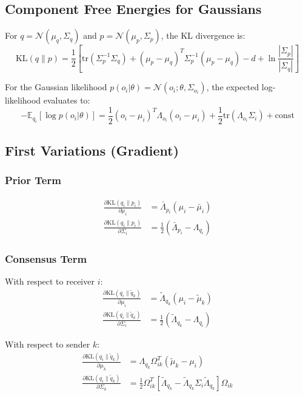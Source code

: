 \documentclass[11pt]{article}
\begin{document}
\subsection{Component Free Energies for Gaussians}

For $q = \mathcal{N}(\mu_q, \Sigma_q)$ and $p = \mathcal{N}(\mu_p, \Sigma_p)$, the KL divergence is:
\begin{equation}
\mathrm{KL}(q \| p) = \frac{1}{2}\left[\mathrm{tr}(\Sigma_p^{-1}\Sigma_q) + (\mu_p - \mu_q)^T \Sigma_p^{-1}(\mu_p - \mu_q) - d + \ln\frac{|\Sigma_p|}{|\Sigma_q|}\right]
\end{equation}

For the Gaussian likelihood $p(o_i | \theta) = \mathcal{N}(o_i; \theta, \Sigma_{o_i})$, the expected log-likelihood evaluates to:
\begin{equation}
-\mathbb{E}_{q_i}[\log p(o_i | \theta)] = \frac{1}{2}(o_i - \mu_i)^T \Lambda_{o_i}(o_i - \mu_i) + \frac{1}{2}\mathrm{tr}(\Lambda_{o_i}\Sigma_i) + \mathrm{const}
\end{equation}

\subsection{First Variations (Gradient)}

\subsubsection{Prior Term}
\begin{align}
\frac{\partial \mathrm{KL}(q_i \| p_i)}{\partial \mu_i} &= \bar{\Lambda}_{p_i}(\mu_i - \bar{\mu}_i) \\
\frac{\partial \mathrm{KL}(q_i \| p_i)}{\partial \Sigma_i} &= \frac{1}{2}(\bar{\Lambda}_{p_i} - \Lambda_{q_i})
\end{align}

\subsubsection{Consensus Term}
With respect to receiver $i$:
\begin{align}
\frac{\partial \mathrm{KL}(q_i \| \tilde{q}_k)}{\partial \mu_i} &= \tilde{\Lambda}_{q_k}(\mu_i - \tilde{\mu}_k) \\
\frac{\partial \mathrm{KL}(q_i \| \tilde{q}_k)}{\partial \Sigma_i} &= \frac{1}{2}(\tilde{\Lambda}_{q_k} - \Lambda_{q_i})
\end{align}

With respect to sender $k$:
\begin{align}
\frac{\partial \mathrm{KL}(q_i \| \tilde{q}_k)}{\partial \mu_k} &= \Lambda_{q_k}\Omega_{ik}^T(\tilde{\mu}_k - \mu_i) \\
\frac{\partial \mathrm{KL}(q_i \| \tilde{q}_k)}{\partial \Sigma_k} &= \frac{1}{2}\Omega_{ik}^T\left[\tilde{\Lambda}_{q_k} - \tilde{\Lambda}_{q_k}\Sigma_i\tilde{\Lambda}_{q_k}\right]\Omega_{ik}
\end{align}
\end{document}
